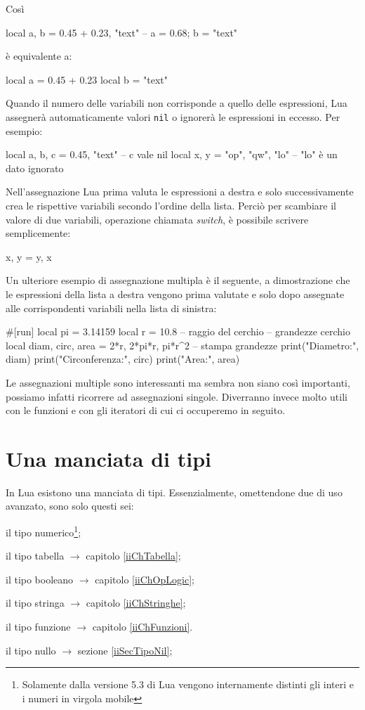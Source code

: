 Così
\begin{lines}
local a, b = 0.45 + 0.23, "text" -- a = 0.68; b = "text"
\end{lines}
è equivalente a:
\begin{lines}
local a = 0.45 + 0.23
local b = "text"
\end{lines}

Quando il numero delle variabili non corrisponde a quello delle espressioni, Lua
assegnerà automaticamente valori \texttt{nil} o ignorerà le espressioni in
eccesso. Per esempio:
\begin{lines}
local a, b, c = 0.45, "text"  -- c vale nil
local x, y = "op", "qw", "lo" -- "lo" è un dato ignorato
\end{lines}

Nell'assegnazione Lua prima valuta le espressioni a destra e solo
successivamente crea le rispettive variabili secondo l'ordine della lista.
Perciò per scambiare il valore di due variabili, operazione chiamata
\emph{switch}, è possibile scrivere semplicemente:
\begin{lines}
x, y = y, x
\end{lines}

Un ulteriore esempio di assegnazione multipla è il seguente, a dimostrazione
che le espressioni della lista a destra vengono prima valutate e solo dopo
assegnate alle corrispondenti variabili nella lista di sinistra:
\begin{lines}
#[run]
local pi = 3.14159
local r = 10.8 -- raggio del cerchio
-- grandezze cerchio
local diam, circ, area = 2*r, 2*pi*r, pi*r^2
-- stampa grandezze
print("Diametro:", diam)
print("Circonferenza:", circ)
print("Area:", area)
\end{lines}

Le assegnazioni multiple sono interessanti ma sembra non siano così importanti,
possiamo infatti ricorrere ad assegnazioni singole. Diverranno invece molto
utili con le funzioni e con gli iteratori di cui ci occuperemo in seguito.


\section{Una manciata di tipi}
\label{iiSecManciataTipi}

In Lua esistono una manciata di tipi. Essenzialmente, omettendone due di uso
avanzato, sono solo questi sei:
\begin{compactitemize}
\item {} il tipo numerico\footnote{Solamente dalla versione 5.3 di Lua
vengono internamente distinti gli interi e i numeri in virgola mobile};
\item {} il tipo tabella \( \to \) capitolo \ref{iiChTabella};
\item {} il tipo booleano \( \to \) capitolo \ref{iiChOpLogic};
\item {} il tipo stringa \( \to \) capitolo \ref{iiChStringhe};
\item {} il tipo funzione \( \to \) capitolo \ref{iiChFunzioni}.
\item {} il tipo nullo \( \to \) sezione \ref{iiSecTipoNil};
\end{compactitemize}

